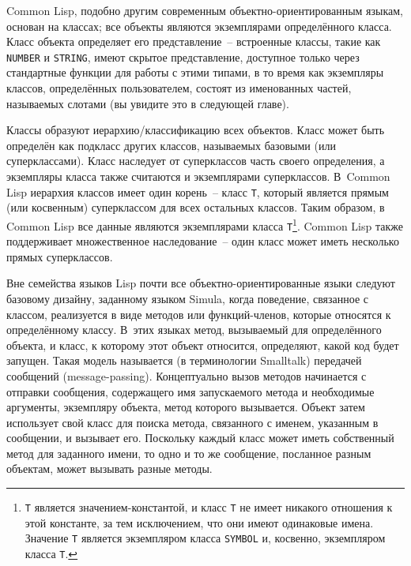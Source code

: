 Common Lisp, подобно другим современным объектно-ориентированным языкам, основан на
классах; все объекты являются экземплярами определённого класса.  Класс объекта
определяет его представление~-- встроенные классы, такие как \lstinline{NUMBER} и \lstinline{STRING},
имеют скрытое представление, доступное только через стандартные функции для работы с этими
типами, в то время как экземпляры классов, определённых пользователем, состоят из
именованных частей, называемых слотами (вы увидите это в следующей главе).

Классы образуют иерархию/классификацию всех объектов.  Класс может быть определён как
подкласс других классов, называемых базовыми (или суперклассами).  Класс наследует от
суперклассов часть своего определения, а экземпляры класса также считаются и экземплярами
суперклассов.  В~Common Lisp иерархия классов имеет один корень~-- класс \lstinline{T}, который
является прямым (или косвенным) суперклассом для всех остальных классов.  Таким образом, в
Common Lisp все данные являются экземплярами класса \lstinline{T}\footnote{\lstinline{T} является
  значением-константой, и класс \lstinline{T} не имеет никакого отношения к этой константе, за
  тем исключением, что они имеют одинаковые имена.  Значение \lstinline{T} является экземпляром
  класса \lstinline{SYMBOL} и, косвенно, экземпляром класса \lstinline{T}.}\hspace{\footnotenegspace}.  Common Lisp также
поддерживает множественное наследование~-- один класс может иметь несколько прямых
суперклассов.

Вне семейства языков Lisp почти все объектно-ориентированные языки следуют базовому
дизайну, заданному языком Simula, когда поведение, связанное с классом, реализуется в виде
методов или функций-членов, которые относятся к определённому классу.  В~этих языках
метод, вызываемый для определённого объекта, и класс, к которому этот объект относится,
определяют, какой код будет запущен.  Такая модель называется (в терминологии Smalltalk)
передачей сообщений (message-passing).  Концептуально вызов методов начинается с отправки
сообщения, содержащего имя запускаемого метода и необходимые аргументы, экземпляру
объекта, метод которого вызывается.  Объект затем использует свой класс для поиска метода,
связанного с именем, указанным в сообщении, и вызывает его.  Поскольку каждый класс может
иметь собственный метод для заданного имени, то одно и то же сообщение, посланное разным
объектам, может вызывать разные методы.

